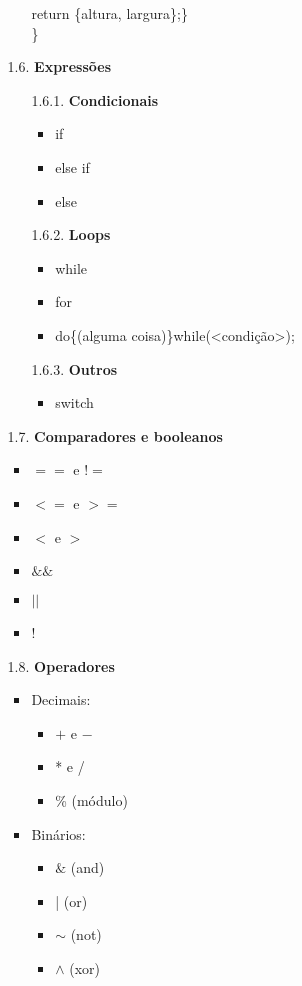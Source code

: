 \documentclass[12pt, a4paper]{article} %
\begin{document}
\begin{enumerate}
\begin{enumerate}
\begin{itemize}
\setlength{\parindent}{3cm} return \{altura, largura\};\} \\
\}
\end{itemize}
\item[1.6.] \textbf{Expressões}
\begin{enumerate}
\item[1.6.1.] \textbf{Condicionais}
\begin{itemize}
\item if
\item else if
\item else
\end{itemize}
\item[1.6.2.] \textbf{Loops}
\begin{itemize}
\item while
\item for
\item do\{(alguma coisa)\}while(<condição>);
\end{itemize}
\item[1.6.3.] \textbf{Outros}
\begin{itemize}
\item switch
\end{itemize}
\end{enumerate}
\item[1.7.] \textbf{Comparadores e booleanos}
\begin{itemize}
\item $==$ e !$=$
\item $<=$ e $>=$
\item $<$ e $>$
\item $\&\&$
\item $||$
\item  !
\end{itemize}
\item[1.8.] \textbf{Operadores}
\begin{itemize}
\item Decimais:
\begin{itemize}
\item $+$ e $-$
\item * e /
\item \% (módulo)
\end{itemize}
\item Binários:
\begin{itemize}
\item $\&$ (and)
\item | (or)
\item $\sim$ (not)
\item $\wedge$ (xor)

\end{itemize}
\end{itemize}
\end{enumerate}
\end{enumerate}
\end{document}
